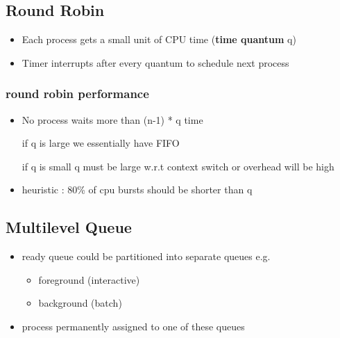 \documentclass[11pt]{article}
\begin{document}
\subsection{Round Robin}
\label{sec:org4150ec3}
\begin{itemize}
\item Each process gets a small unit of CPU time (\textbf{time quantum} q)
\item Timer interrupts after every quantum to schedule next process
\end{itemize}
\subsubsection{round robin performance}
\label{sec:org1d1cad1}
\begin{itemize}
\item No process waits more than (n-1) * q time
\item[{if q is large}] we essentially have FIFO
\item[{if q is small}] q must be large w.r.t context switch or overhead will be high
\item heuristic : 80\% of cpu bursts should be shorter than q
\end{itemize}
\subsection{Multilevel Queue}
\label{sec:org256f523}
\begin{itemize}
\item ready queue could be partitioned into separate queues e.g.
\begin{itemize}
\item foreground (interactive)
\item background (batch)
\end{itemize}
\item process permanently assigned to one of these queues
\end{itemize}
\end{document}
